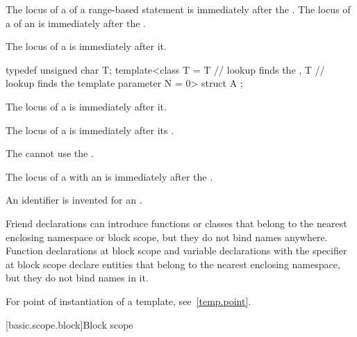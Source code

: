 \pnum
The locus of a 
of a range-based  statement
is immediately after the .
The locus of a 
of an 
is immediately after the .

\pnum
The locus of a  is immediately after it.
\begin{example}
\begin{codeblock}
typedef unsigned char T;
template<class T
  = T               // lookup finds the 
  , T               // lookup finds the template parameter
    N = 0> struct A { };
\end{codeblock}
\end{example}

\pnum
The locus of a 
is immediately after it.

\pnum
The locus of a 
is immediately after its .
\begin{note}
The  cannot use
the .
\end{note}

\pnum
The locus of a 
with an 
is immediately after the .
\begin{note}
An identifier is invented
for an .
\end{note}

\pnum
\begin{note}
Friend declarations can introduce functions or classes
that belong to the nearest enclosing namespace or block scope,
but they do not bind names anywhere.
Function declarations at block scope and
variable declarations with the  specifier at block scope
declare entities
that belong to the nearest enclosing namespace,
but they do not bind names in it.
\end{note}

\pnum
\begin{note}
For point of instantiation of a template, see~\ref{temp.point}.
\end{note}

[basic.scope.block]{Block scope}

